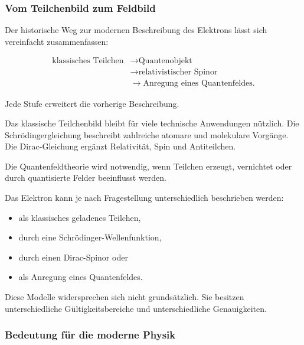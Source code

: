 \subsubsection*{Vom Teilchenbild zum Feldbild}

Der historische Weg zur modernen Beschreibung des Elektrons lässt sich
vereinfacht zusammenfassen:

\begin{equation}
	\begin{aligned}
		\text{klassisches Teilchen}
		&\longrightarrow
		\text{Quantenobjekt}
		\\
		&\longrightarrow
		\text{relativistischer Spinor}
		\\
		&\longrightarrow
		\text{Anregung eines Quantenfeldes}.
	\end{aligned}
	\label{eq:entwicklung_elektronenbild}
\end{equation}

Jede Stufe erweitert die vorherige Beschreibung.

Das klassische Teilchenbild bleibt für viele technische Anwendungen
nützlich. Die Schrödingergleichung beschreibt zahlreiche atomare und
molekulare Vorgänge. Die Dirac-Gleichung ergänzt Relativität, Spin und
Antiteilchen.

Die Quantenfeldtheorie wird notwendig, wenn Teilchen erzeugt,
vernichtet oder durch quantisierte Felder beeinflusst werden.

\begin{DidacticBox}
	\label{box:mehrere_beschreibungen_elektron}
	
	Das Elektron kann je nach Fragestellung unterschiedlich beschrieben
	werden:
	
	\begin{itemize}
		\item als klassisches geladenes Teilchen,
		\item durch eine Schrödinger-Wellenfunktion,
		\item durch einen Dirac-Spinor oder
		\item als Anregung eines Quantenfeldes.
	\end{itemize}
	
	Diese Modelle widersprechen sich nicht grundsätzlich. Sie besitzen
	unterschiedliche Gültigkeitsbereiche und unterschiedliche
	Genauigkeiten.
\end{DidacticBox}

\subsubsection*{Bedeutung für die moderne Physik}

